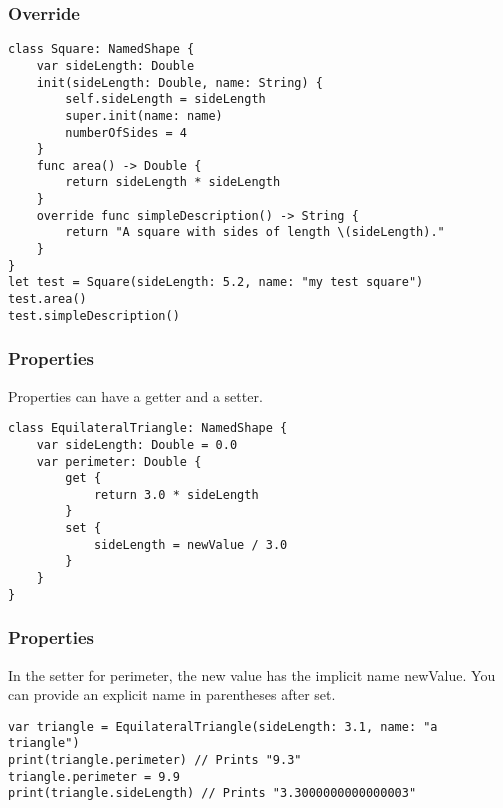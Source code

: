 \begin{frame}[fragile] \frametitle{Override}

\begin{lstlisting}
class Square: NamedShape {
    var sideLength: Double
    init(sideLength: Double, name: String) {
        self.sideLength = sideLength
        super.init(name: name)
        numberOfSides = 4
    }
    func area() -> Double {
        return sideLength * sideLength
    }
    override func simpleDescription() -> String {
        return "A square with sides of length \(sideLength)."
    }
}
let test = Square(sideLength: 5.2, name: "my test square")
test.area()
test.simpleDescription()
\end{lstlisting}

\end{frame}


\begin{frame}[fragile] \frametitle{Properties}

Properties can have a getter and a setter.

\begin{lstlisting}
class EquilateralTriangle: NamedShape {
    var sideLength: Double = 0.0
    var perimeter: Double {
        get {
            return 3.0 * sideLength
        }
        set {
            sideLength = newValue / 3.0
        }
    }
}
\end{lstlisting}


\end{frame}

\begin{frame}[fragile] \frametitle{Properties}

In the setter for perimeter, the new value has the implicit name newValue. You can provide an explicit name in parentheses after set.


\begin{lstlisting}
var triangle = EquilateralTriangle(sideLength: 3.1, name: "a triangle")
print(triangle.perimeter) // Prints "9.3"
triangle.perimeter = 9.9
print(triangle.sideLength) // Prints "3.3000000000000003"
\end{lstlisting}


\end{frame}

